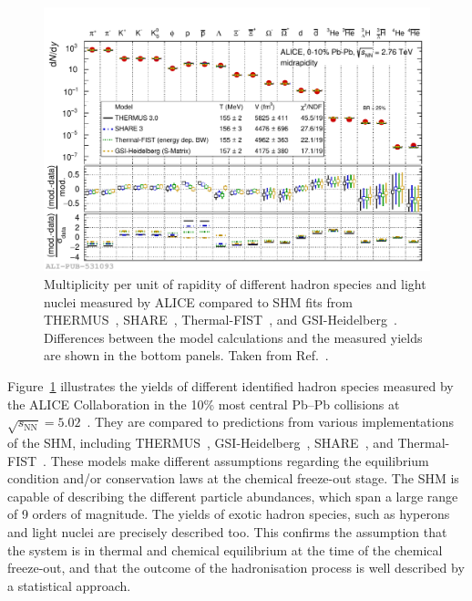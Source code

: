 \begin{figure}[htb]
  \centering
  \includegraphics[width=\linewidth]{Figures/Chapter 1/SHM_fit_PbPb010_arp_all.pdf}
  \caption{Multiplicity per unit of rapidity of different hadron species and light nuclei measured by ALICE compared to SHM fits from THERMUS~\cite{Wheaton:2004qb}, SHARE~\cite{Torrieri:2004zz}, Thermal-FIST~\cite{Vovchenko:2019pjl}, and GSI-Heidelberg~\cite{Andronic:2005yp}. Differences between the model calculations and the measured yields are shown in the bottom panels. Taken from Ref.~\cite{ALICE:2022wpn}.}
  \label{fig:SHM_fit}
\end{figure}

\begin{sloppypar}
Figure~\ref{fig:SHM_fit} illustrates the yields of different identified hadron species measured by the ALICE Collaboration in the 10\% most central Pb--Pb collisions at \mbox{$\sqrt{s_\mathrm{NN}} = 5.02$~\tev}. They are compared to predictions from various implementations of the SHM, including THERMUS~\cite{Wheaton:2004qb}, GSI-Heidelberg~\cite{Andronic:2005yp}, SHARE~\cite{Torrieri:2004zz}, and Thermal-FIST~\cite{Vovchenko:2019pjl}. These models make different assumptions regarding the equilibrium condition and/or conservation laws at the chemical freeze-out stage. The SHM is capable of describing the different particle abundances, which span a large range of 9 orders of magnitude. The yields of exotic hadron species, such as hyperons and light nuclei are precisely described too. This confirms the assumption that the system is in thermal and chemical equilibrium at the time of the chemical freeze-out, and that the outcome of the hadronisation process is well described by a statistical approach.
\end{sloppypar}

